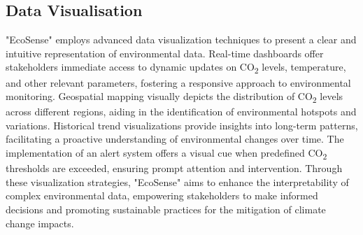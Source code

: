 \documentclass[conference]{IEEEtran}
\begin{document}
\subsection{Data Visualisation}

"EcoSense" employs advanced data visualization techniques to present a clear and intuitive representation of environmental data. Real-time dashboards offer stakeholders immediate access to dynamic updates on CO\textsubscript{2} levels, temperature, and other relevant parameters, fostering a responsive approach to environmental monitoring. Geospatial mapping visually depicts the distribution of CO\textsubscript{2} levels across different regions, aiding in the identification of environmental hotspots and variations. Historical trend visualizations provide insights into long-term patterns, facilitating a proactive understanding of environmental changes over time. The implementation of an alert system offers a visual cue when predefined CO\textsubscript{2} thresholds are exceeded, ensuring prompt attention and intervention. Through these visualization strategies, "EcoSense" aims to enhance the interpretability of complex environmental data, empowering stakeholders to make informed decisions and promoting sustainable practices for the mitigation of climate change impacts.








\end{document}
